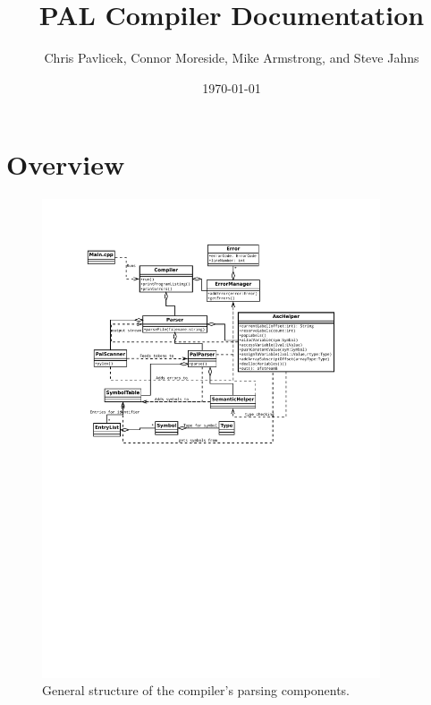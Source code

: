 \documentclass{article}
\begin{document}
\title{PAL Compiler Documentation }
\date{\today}
\author{Chris Pavlicek, Connor Moreside, Mike Armstrong, and Steve Jahns}
\maketitle

%
%

\section*{Overview}

\begin{figure}[h!]
\centering \includegraphics[width=10cm]{uml.pdf}
\caption{General structure of the compiler's parsing components.}
\end{figure}
\end{document}
